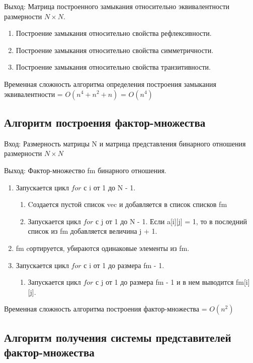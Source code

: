 \documentclass[bachelor, och, labwork]{shiza}
\begin{document}
	$\textit{Выход:}$  Матрица построенного замыкания относительно эквивалентности размерности $N \times N$.
	
	\begin{enumerate} 
		\item Построение замыкания относительно свойства рефлексивности.
		\item Построение замыкания относительно свойства симметричности.
		\item Построение замыкания относительно свойства транзитивности.
	\end{enumerate} 
	
	Временная сложность алгоритма определения построения замыкания эквивалентности = $O(n^4 + n^2 + n)$ = $O(n^4)$
	
		\subsection{Алгоритм построения фактор-множества}
	
	$\textit{Вход:}$ Размерность матрицы N и матрица представления бинарного отношения размерности $N \times N$
	
	$\textit{Выход:}$  Фактор-множество fm бинарного отношения.
	
	\begin{enumerate} 
	\item Запускается цикл $for$ с i от 1 до N - 1. 
		\begin{enumerate} 
			\item Cоздается пустой список vec и добавляется в список списков fm
			\item Запускается цикл $for$ с j от 1 до N - 1. Если a[i][j] = 1, то в последний список из fm добавляется величина j + 1.
		\end{enumerate} 
	\item fm cортируется, убираются одинаковые элементы из fm.
	\item Запускается цикл $for$ с i от 1 до размера fm - 1.
		\begin{enumerate} 
		\item Запускается цикл $for$ с j от 1 до размера fm - 1 и в нем выводится fm[i][j].
		\end{enumerate} 
	\end{enumerate} 
	
	Временная сложность алгоритма построения фактор-множества = $O(n^2)$
	
	
	\subsection{Алгоритм получения системы представителей фактор-множества}
\end{document}
